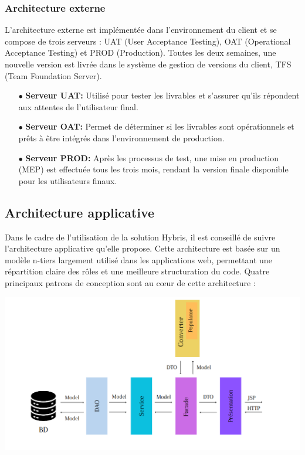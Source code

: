 \subsubsection{Architecture externe}

L'architecture externe est implémentée dans l'environnement du client et se compose de trois serveurs : UAT (User Acceptance Testing), OAT (Operational Acceptance Testing) et PROD (Production). Toutes les deux semaines, une nouvelle version est livrée dans le système de gestion de versions du client, TFS (Team Foundation Server).

\begin{itemize} \item [$\bullet$]\textbf{Serveur UAT:} Utilisé pour tester les livrables et s'assurer qu'ils répondent aux attentes de l'utilisateur final. \item [$\bullet$]\textbf{Serveur OAT:} Permet de déterminer si les livrables sont opérationnels et prêts à être intégrés dans l'environnement de production. \item [$\bullet$]\textbf{Serveur PROD:} Après les processus de test, une mise en production (MEP) est effectuée tous les trois mois, rendant la version finale disponible pour les utilisateurs finaux. \end{itemize}

\subsection{Architecture applicative}

Dans le cadre de l'utilisation de la solution Hybris, il est conseillé de suivre l'architecture applicative qu'elle propose. Cette architecture est basée sur un modèle n-tiers largement utilisé dans les applications web, permettant une répartition claire des rôles et une meilleure structuration du code. Quatre principaux patrons de conception sont au cœur de cette architecture :

\begin{center}
    \centering
    \includegraphics[width=19cm]{Figures/Dto.png}
    \label{fig:processus}
\end{center} 

